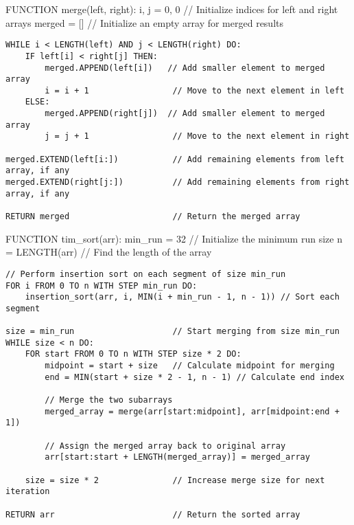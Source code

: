 \documentclass[11pt]{article}
\begin{document}
FUNCTION merge(left, right): i, j = 0, 0 // Initialize indices for left
and right arrays merged = {[}{]} // Initialize an empty array for merged
results

\begin{verbatim}
WHILE i < LENGTH(left) AND j < LENGTH(right) DO:
    IF left[i] < right[j] THEN:
        merged.APPEND(left[i])   // Add smaller element to merged array
        i = i + 1                 // Move to the next element in left
    ELSE:
        merged.APPEND(right[j])  // Add smaller element to merged array
        j = j + 1                 // Move to the next element in right

merged.EXTEND(left[i:])           // Add remaining elements from left array, if any
merged.EXTEND(right[j:])          // Add remaining elements from right array, if any

RETURN merged                     // Return the merged array
\end{verbatim}

FUNCTION tim\_sort(arr): min\_run = 32 // Initialize the minimum run
size n = LENGTH(arr) // Find the length of the array

\begin{verbatim}
// Perform insertion sort on each segment of size min_run
FOR i FROM 0 TO n WITH STEP min_run DO:
    insertion_sort(arr, i, MIN(i + min_run - 1, n - 1)) // Sort each segment

size = min_run                    // Start merging from size min_run
WHILE size < n DO:
    FOR start FROM 0 TO n WITH STEP size * 2 DO:
        midpoint = start + size   // Calculate midpoint for merging
        end = MIN(start + size * 2 - 1, n - 1) // Calculate end index

        // Merge the two subarrays
        merged_array = merge(arr[start:midpoint], arr[midpoint:end + 1])

        // Assign the merged array back to original array
        arr[start:start + LENGTH(merged_array)] = merged_array

    size = size * 2               // Increase merge size for next iteration

RETURN arr                        // Return the sorted array
\end{verbatim}
\end{document}
